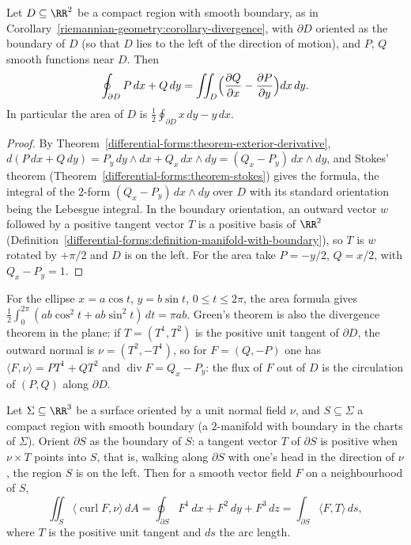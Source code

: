 \begin{corollary}\label{riemannian-geometry:corollary-green-theorem}
Let $D \subseteq \RR^2$ be a compact region with smooth boundary, as in Corollary~\ref{riemannian-geometry:corollary-divergence}, with $\partial D$ oriented as the boundary of $D$ (so that $D$ lies to the left
of the direction of motion), and $P$, $Q$ smooth functions near $D$. Then
\[
\oint_{\partial D}P\,dx + Q\,dy = \iint_D\Bigl(\frac{\partial Q}{\partial x} - \frac{\partial P}{\partial y}\Bigr)dx\,dy .
\]
In particular the area of $D$ is $\frac12\oint_{\partial D}x\,dy - y\,dx$.
\end{corollary}

\begin{proof}
By Theorem~\ref{differential-forms:theorem-exterior-derivative}, $d(P\,dx + Q\,dy) = P_y\,dy \wedge dx + Q_x\,dx \wedge dy = (Q_x - P_y)\,dx \wedge dy$, and Stokes' theorem
(Theorem~\ref{differential-forms:theorem-stokes}) gives the formula, the integral of the $2$-form $(Q_x - P_y)\,dx \wedge dy$ over $D$ with its standard orientation being the Lebesgue integral. In the boundary
orientation, an outward vector $w$ followed by a positive tangent vector $T$ is a positive basis of $\RR^2$ (Definition~\ref{differential-forms:definition-manifold-with-boundary}), so $T$ is $w$ rotated by $+\pi/2$
and $D$ is on the left. For the area take $P = -y/2$, $Q = x/2$, with $Q_x - P_y = 1$.
\end{proof}

For the ellipse $x = a\cos t$, $y = b\sin t$, $0 \leq t \leq 2\pi$, the area formula gives $\frac12\int_0^{2\pi}(ab\cos^2t + ab\sin^2t)\,dt = \pi ab$. Green's theorem is also the divergence theorem in the plane:
if $T = (T^1, T^2)$ is the positive unit tangent of $\partial D$, the outward normal is $\nu = (T^2, -T^1)$, so for $F = (Q, -P)$ one has $\langle F, \nu\rangle = PT^1 + QT^2$ and $\operatorname{div}F = Q_x - P_y$: the flux of
$F$ out of $D$ is the circulation of $(P, Q)$ along $\partial D$.

\begin{corollary}\label{riemannian-geometry:corollary-kelvin-stokes}
Let $\Sigma \subseteq \RR^3$ be a surface oriented by a unit normal field $\nu$, and $S \subseteq \Sigma$ a compact region with smooth boundary (a $2$-manifold with boundary in the charts of $\Sigma$). Orient
$\partial S$ as the boundary of $S$: a tangent vector $T$ of $\partial S$ is positive when $\nu \times T$ points into $S$, that is, walking along $\partial S$ with one's head in the direction of $\nu$, the
region $S$ is on the left. Then for a smooth vector field $F$ on a neighbourhood of $S$,
\[
\iint_S\langle\operatorname{curl}F, \nu\rangle\,dA = \oint_{\partial S}F^1\,dx + F^2\,dy + F^3\,dz = \int_{\partial S}\langle F, T\rangle\,ds,
\]
where $T$ is the positive unit tangent and $ds$ the arc length.
\end{corollary}

